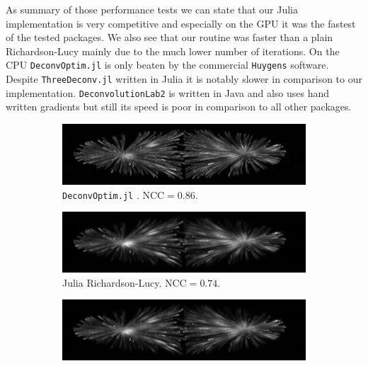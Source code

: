 \documentclass{juliacon}
\begin{document}
        As summary of those performance tests we can state that our Julia implementation is very competitive and especially on the GPU
        it was the fastest of the tested packages. 
        We also see that our routine was faster than a plain Richardson-Lucy mainly due to the much lower number
        of iterations.
        On the CPU \verb|DeconvOptim.jl| is only beaten by the commercial \verb|Huygens| software. 
        Despite \verb|ThreeDeconv.jl| written in Julia it is notably slower in comparison to our implementation.
        \verb|DeconvolutionLab2| is written in Java and also uses hand written gradients but still its speed is poor in
        comparison to all other packages.

        \begin{figure}[h]
            \centering
            \begin{subfigure}{.3\textwidth}
                \centering
                \includegraphics[width=\textwidth]{figures/MIPs/mip_DeconvOptim.png}
                \caption{\texttt{DeconvOptim.jl} . $\text{NCC}= 0.86$.}
            \end{subfigure}
            \begin{subfigure}{.3\textwidth}
                \centering
                \includegraphics[width=\textwidth]{figures/MIPs/mip_DeconvOptim_RL.png}
                \caption{Julia Richardson-Lucy. $\text{NCC}= 0.74$.}
            \end{subfigure}
            \begin{subfigure}{.3\textwidth}
                \centering
                \includegraphics[width=\textwidth]{figures/MIPs/mip_DeconvolutionLab2.png}

\end{subfigure}
\end{figure}
\end{document}
